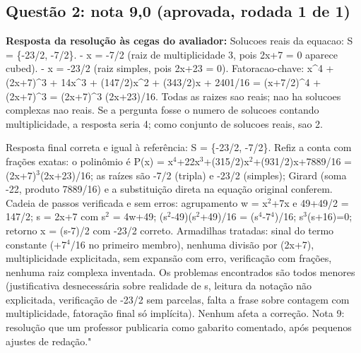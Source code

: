 \documentclass{article}%
\begin{document}
\subsection*{Questão 2: nota 9,0 (aprovada, rodada 1 de 1)}%
\textbf{Resposta da resolução às cegas do avaliador:} Solucoes reais da equacao: S = \{{-}23/2, {-}7/2\}.\newline%
\newline%
{-} x = {-}7/2 (raiz de multiplicidade 3, pois 2x+7 = 0 aparece cubed).\newline%
{-} x = {-}23/2 (raiz simples, pois 2x+23 = 0).\newline%
\newline%
Fatoracao{-}chave: x\^{}4 + (2x+7)\^{}3 + 14x\^{}3 + (147/2)x\^{}2 + (343/2)x + 2401/16 = (x+7/2)\^{}4 + (2x+7)\^{}3 = (2x+7)\^{}3 (2x+23)/16.\newline%
Todas as raizes sao reais; nao ha solucoes complexas nao reais. Se a pergunta fosse o numero de solucoes contando multiplicidade, a resposta seria 4; como conjunto de solucoes reais, sao 2.\par %
Resposta final correta e igual à referência: S = \{-23/2, -7/2\}. Refiz a conta com frações exatas: o polinômio é P(x) = x$^{4}$+22x$^3$+(315/2)x$^2$+(931/2)x+7889/16 = (2x+7)$^3$(2x+23)/16; as raízes são -7/2 (tripla) e -23/2 (simples); Girard (soma -22, produto 7889/16) e a substituição direta na equação original conferem. Cadeia de passos verificada e sem erros: agrupamento w = x$^2$+7x e 49+49/2 = 147/2; s = 2x+7 com s$^2$ = 4w+49; (s$^2$-49)(s$^2$+49)/16 = (s$^{4}$-7$^{4}$)/16; s$^3$(s+16)=0; retorno x = (s-7)/2 com -23/2 correto. Armadilhas tratadas: sinal do termo constante (+7$^{4}$/16 no primeiro membro), nenhuma divisão por (2x+7), multiplicidade explicitada, sem expansão com erro, verificação com frações, nenhuma raiz complexa inventada. Os problemas encontrados são todos menores (justificativa desnecessária sobre realidade de s, leitura da notação não explicitada, verificação de -23/2 sem parcelas, falta a frase sobre contagem com multiplicidade, fatoração final só implícita). Nenhum afeta a correção. Nota 9: resolução que um professor publicaria como gabarito comentado, após pequenos ajustes de redação."%
\end{document}
